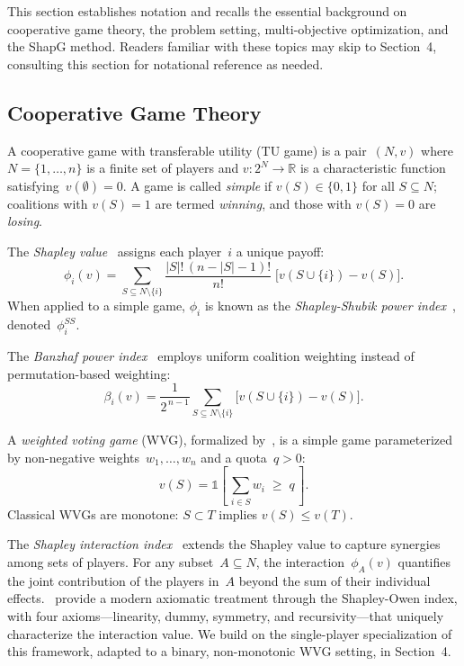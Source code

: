 \documentclass{article} %
\begin{document}
This section establishes notation and recalls the essential background on cooperative game theory, the problem setting, multi-objective optimization, and the ShapG method. Readers familiar with these topics may skip to Section~4, consulting this section for notational reference as needed.

\subsection{Cooperative Game Theory}

A cooperative game with transferable utility (TU game) is a pair~$(N, v)$ where $N = \{1, \dots, n\}$ is a finite set of players and $v: 2^N \to \mathbb{R}$ is a characteristic function satisfying~$v(\emptyset) = 0$. A game is called {\em simple} if $v(S) \in \{0,1\}$ for all $S \subseteq N$; coalitions with $v(S) = 1$ are termed {\em winning}, and those with $v(S) = 0$ are {\em losing}.

The {\em Shapley value}~\citep{shapley1953value} assigns each player~$i$ a unique payoff:
\begin{equation}
\phi_i(v) = \sum_{S \subseteq N \setminus \{i\}} \frac{|S|!\,(n - |S| - 1)!}{n!} \;\bigl[v(S \cup \{i\}) - v(S)\bigr].
\label{eq:shapley}
\end{equation}
When applied to a simple game, $\phi_i$ is known as the {\em Shapley-Shubik power index}~\citep{shapley1954method}, denoted~$\phi_i^{SS}$.

The {\em Banzhaf power index}~\citep{banzhaf1965weighted} employs uniform coalition weighting instead of permutation-based weighting:
\begin{equation}
\beta_i(v) = \frac{1}{2^{\,n-1}} \sum_{S \subseteq N \setminus \{i\}} \bigl[v(S \cup \{i\}) - v(S)\bigr].
\label{eq:banzhaf}
\end{equation}

A {\em weighted voting game} (WVG), formalized by~\citet{owen1972multilinear}, is a simple game parameterized by non-negative weights~$w_1, \dots, w_n$ and a quota~$q > 0$:
\begin{equation}
v(S) = \mathbb{1}\!\left[\,\sum_{i \in S} w_i \;\geq\; q\,\right].
\label{eq:wvg}
\end{equation}
Classical WVGs are monotone: $S \subset T$ implies $v(S) \leq v(T)$.

The {\em Shapley interaction index}~\citep{grabisch1999axiomatic} extends the Shapley value to capture synergies among sets of players. For any subset~$A \subseteq N$, the interaction~$\phi_A(v)$ quantifies the joint contribution of the players in~$A$ beyond the sum of their individual effects.~\citet{rabitti2019shapley} provide a modern axiomatic treatment through the Shapley-Owen index, with four axioms---linearity, dummy, symmetry, and recursivity---that uniquely characterize the interaction value. We build on the single-player specialization of this framework, adapted to a binary, non-monotonic WVG setting, in Section~4.
\end{document}
